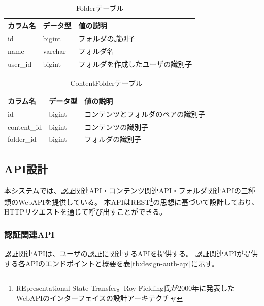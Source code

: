 \begin{table}[htbp]
  \label{tb:design-folder-table}
  \caption{Folderテーブル}
  \begin{center}
    \begin{tabular}{|l|l|l|}
      \hline
      カラム名 & データ型 & 値の説明 \\\hline\hline
      id & bigint & フォルダの識別子 \\\hline
      name & varchar & フォルダ名 \\\hline
      user\_id & bigint & フォルダを作成したユーザの識別子 \\\hline
    \end{tabular}
  \end{center}
\end{table}

\begin{table}[htbp]
  \label{tb:design-content-folder-table}
  \caption{ContentFolderテーブル}
  \begin{center}
    \begin{tabular}{|l|l|l|}
      \hline
      カラム名 & データ型 & 値の説明 \\\hline\hline
      id & bigint & コンテンツとフォルダのペアの識別子 \\\hline
      content\_id & bigint & コンテンツの識別子 \\\hline
      folder\_id & bigint & フォルダの識別子 \\\hline
    \end{tabular}
  \end{center}
\end{table}

\subsection{API設計}
本システムでは、認証関連API・コンテンツ関連API・フォルダ関連APIの三種類のWebAPIを提供している。
本APIはREST\footnote{REpresentational State Transfer。Roy Fielding氏が2000年に発表したWebAPIのインターフェイスの設計アーキテクチャ}の思想に基づいて設計しており、HTTPリクエストを通じて呼び出すことができる。

\subsubsection{認証関連API}
認証関連APIは、ユーザの認証に関連するAPIを提供する。
認証関連APIが提供する各APIのエンドポイントと概要を表\ref{tb:design-auth-api}に示す。

